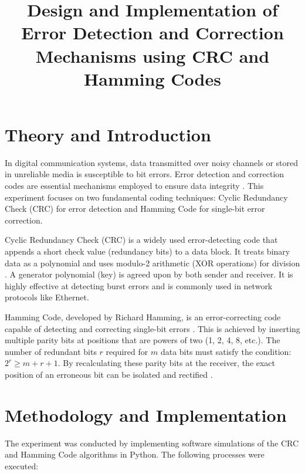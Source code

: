 \documentclass[11pt]{article}
\title{Design and Implementation of Error Detection and Correction Mechanisms using CRC and Hamming Codes}
\author{}
\date{}
\begin{document}


\pagebreak

\tableofcontents

\pagebreak
{}
\maketitle

\section{Theory and Introduction}
In digital communication systems, data transmitted over noisy channels or stored in unreliable media is susceptible to bit errors. Error detection and correction codes are essential mechanisms employed to ensure data integrity \cite{tanenbaum2021}. This experiment focuses on two fundamental coding techniques: Cyclic Redundancy Check (CRC) for error detection and Hamming Code for single-bit error correction.

Cyclic Redundancy Check (CRC) is a widely used error-detecting code that appends a short check value (redundancy bits) to a data block. It treats binary data as a polynomial and uses modulo-2 arithmetic (XOR operations) for division \cite{geeks_crc}. A generator polynomial (key) is agreed upon by both sender and receiver. It is highly effective at detecting burst errors and is commonly used in network protocols like Ethernet.

Hamming Code, developed by Richard Hamming, is an error-correcting code capable of detecting and correcting single-bit errors \cite{hamming1950}. This is achieved by inserting multiple parity bits at positions that are powers of two (1, 2, 4, 8, etc.). The number of redundant bits $r$ required for $m$ data bits must satisfy the condition: $2^r \ge m + r + 1$. By recalculating these parity bits at the receiver, the exact position of an erroneous bit can be isolated and rectified \cite{geeks_hamming}.

\section{Methodology and Implementation}
The experiment was conducted by implementing software simulations of the CRC and Hamming Code algorithms in Python. The following processes were executed:
\end{document}
